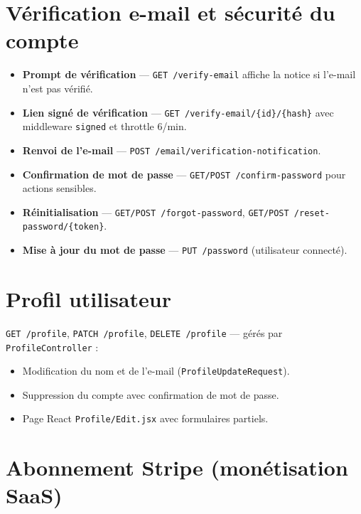\documentclass[11pt,a4paper]{report}
\newcommand{\route}[1]{\texttt{\small #1}}
\newcommand{\ctrl}[1]{\texttt{\small #1}}
\newcommand{\feat}[1]{\textbf{#1}}
\begin{document}
\section{Vérification e-mail et sécurité du compte}

\begin{itemize}[leftmargin=*]
    \item \feat{Prompt de vérification} — \route{GET /verify-email} affiche la notice si l'e-mail n'est pas vérifié.
    \item \feat{Lien signé de vérification} — \route{GET /verify-email/\{id\}/\{hash\}} avec middleware \texttt{signed} et throttle 6/min.
    \item \feat{Renvoi de l'e-mail} — \route{POST /email/verification-notification}.
    \item \feat{Confirmation de mot de passe} — \route{GET/POST /confirm-password} pour actions sensibles.
    \item \feat{Réinitialisation} — \route{GET/POST /forgot-password}, \route{GET/POST /reset-password/\{token\}}.
    \item \feat{Mise à jour du mot de passe} — \route{PUT /password} (utilisateur connecté).
\end{itemize}

\section{Profil utilisateur}

\route{GET /profile}, \route{PATCH /profile}, \route{DELETE /profile} — gérés par \ctrl{ProfileController} :
\begin{itemize}[leftmargin=*]
    \item Modification du nom et de l'e-mail (\texttt{ProfileUpdateRequest}).
    \item Suppression du compte avec confirmation de mot de passe.
    \item Page React \texttt{Profile/Edit.jsx} avec formulaires partiels.
\end{itemize}

\section{Abonnement Stripe (monétisation SaaS)}
\end{document}
